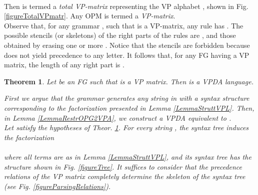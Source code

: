 \documentclass[3p,11pt]{elsarticle}
\newtheorem{theorem}{Theorem}[section]
\newenvironment{proof}[1][Proof]{\begin{trivlist}
\item[\hskip \labelsep {\bfseries #1}]}{\end{trivlist}}
\begin{document}
\\
Then  is termed a \emph{total VP-matrix}  representing the VP alphabet , shown in Fig. \ref{figureTotalVPmatr}. Any OPM  is termed a \emph{VP-matrix}.
\\
Observe that, for any  grammar , such that  is a VP-matrix, any rule  has . The possible stencils (or skeletons) of the right parts of the rules are , and those obtained by erasing one or more . Notice that the stencils  are forbidden because  does not yield precedence to any letter. It follows that, for any FG having a VP matrix, the length of any right part is .
\begin{theorem}\label{TheorRestrOPGisVP}
Let  be an FG such that  is a VP matrix. Then  is a VPDA language.
\begin{proof}
First we argue that the grammar generates any string in  with a syntax structure corresponding to the factorization presented in Lemma \ref{LemmaStruttVPL}. Then, in Lemma \ref{LemmaRestrOPG2VPA}, we construct a VPDA equivalent to .
\\
Let  satisfy the hypotheses of Theor. \ref{TheorRestrOPGisVP}. For every string , the syntax tree induces the factorization\\

\\where all terms are as
in Lemma \ref{LemmaStruttVPL}, and its syntax tree has the structure shown in Fig. \ref{figureTree}. It suffices to consider that the precedence relations of the VP matrix completely determine the skeleton of the syntax tree (see Fig. \ref{figureParsingRelations}).
\end{proof}
\end{theorem}
\end{document}
